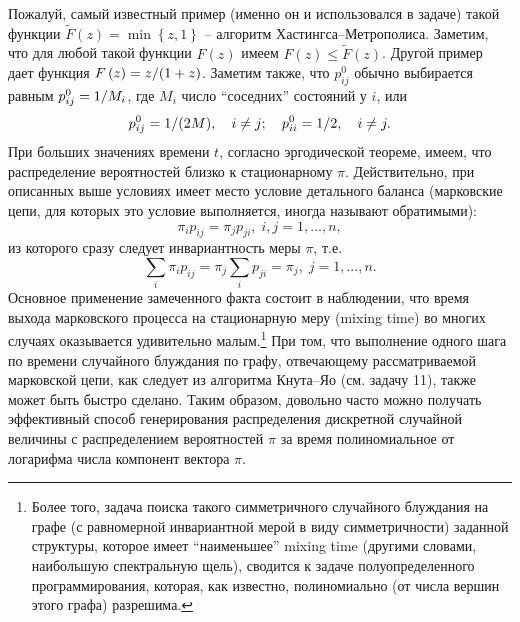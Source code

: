 \begin{ordre}
Пожалуй, самый известный пример (именно он и использовался в задаче) такой 
функции $\tilde {F}\left( z \right)=\min \left\{ {z,1} \right\}$ -- алгоритм 
Хастингса--Метрополиса. Заметим, что для любой такой функции $F\left( z 
\right)$ имеем $F\left( z \right)\le \tilde {F}\left( z \right)$. Другой 
пример дает функция $F\left( z \right)=z \mathord{\left/ {\vphantom {z 
{\left( {1+z} \right)}}} \right. \kern-\nulldelimiterspace} {\left( {1+z} 
\right)}$. Заметим также, что $p_{ij}^0 $ обычно выбирается равным $p_{ij}^0 
=1 \mathord{\left/ {\vphantom {1 M}} \right. \kern-\nulldelimiterspace} M_i 
$, где $M_i $ число ``соседних'' состояний у $i$, или
\[
p_{ij}^0 =1 \mathord{\left/ {\vphantom {1 {\left( {2M} \right)}}} \right. 
\kern-\nulldelimiterspace} {\left( {2M} \right)},
\quad
i\ne j;
\quad
p_{ii}^0 =1 \mathord{\left/ {\vphantom {1 2}} \right. 
\kern-\nulldelimiterspace} 2,
\quad
i\ne j.
\]
При больших значениях времени $t$, согласно эргодической теореме, имеем, что 
распределение вероятностей близко к стационарному $\pi $. Действительно, при 
описанных выше условиях имеет место условие детального баланса (марковские 
цепи, для которых это условие выполняется, иногда называют обратимыми):
\[
\pi _i p_{ij} =\pi _j p_{ji} ,\;i,j=1,...,n,
\]
из которого сразу следует инвариантность меры $\pi $, т.е.
\[
\sum\limits_i {\pi _i p_{ij} } =\pi _j \sum\limits_i {p_{ji} } =\pi _j 
,\;j=1,...,n.
\]
Основное применение замеченного факта состоит в наблюдении, что время выхода 
марковского процесса на стационарную меру (mixing time) во многих случаях 
оказывается удивительно малым.\footnote{ Более того, задача поиска такого 
симметричного случайного блуждания на графе (с равномерной инвариантной 
мерой в виду симметричности) заданной структуры, которое имеет 
``наименьшее'' mixing time (другими словами, наибольшую спектральную щель), 
сводится к задаче полуопределенного программирования, которая, как известно, 
полиномиально (от числа вершин этого графа) разрешима.} При том, что 
выполнение одного шага по времени случайного блуждания по графу, отвечающему 
рассматриваемой марковской цепи, как следует из алгоритма Кнута--Яо (см. задачу 11), также 
может быть быстро сделано. Таким образом, довольно часто можно получать 
эффективный способ генерирования распределения дискретной случайной величины 
с распределением вероятностей $\pi $ за время полиномиальное от логарифма 
числа компонент вектора $\pi $.


\end{ordre}
